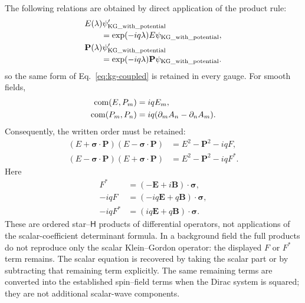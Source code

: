 \documentclass[10pt,letterpaper]{article}
\let\STAamsmathtext\text
\newcommand{\eqtext}[1]{\STAamsmathtext{\normalfont\rmfamily #1}}
\newcommand{\eqfunc}[1]{\operatorname{#1}}
\renewcommand{\text}[1]{\STAamsmathtext{\normalfont\rmfamily #1}}
\newcommand{\pv}[1]{#1}
\newcommand{\vct}[1]{\mathbf{#1}}
\newcommand{\sigv}{\vct{\pv{\bm{\sigma}}}}
\newcommand{\Hop}{\mathsf H}
\newcommand{\conj}[1]{#1^{*}}
\newcommand{\com}[2]{\eqfunc{com}\!\left(#1,#2\right)}
\begin{document}
The following relations are obtained by direct application of the product
rule:
\begin{equation}
\begin{aligned}
&E(\lambda)\psi_{\eqtext{KG\_with\_potential}}'\\[-0.2em]
&\qquad
=\exp(-iq\lambda)E\psi_{\eqtext{KG\_with\_potential}},\\
&\vct{P}(\lambda)\psi_{\eqtext{KG\_with\_potential}}'\\[-0.2em]
&\qquad
=\exp(-iq\lambda)\vct{P}\psi_{\eqtext{KG\_with\_potential}}.
\end{aligned}
\label{eq:kg-gauge}
\end{equation}
so the same form of Eq.\ \eqref{eq:kg-coupled} is retained in every gauge.
For smooth fields,
\begin{align}
\com{E}{P_m}&=iqE_m,\notag\\
\com{P_m}{P_n}&=iq(\partial_mA_n-\partial_nA_m).
\label{eq:commutators}
\end{align}
Consequently, the written order must be retained:
\begin{align}
(E+\sigv\cdot\vct{P})(E-\sigv\cdot\vct{P})
 &=E^2-\vct{P}^2-iq\pv{F},
\label{eq:EP-factorization}\\
(E-\sigv\cdot\vct{P})(E+\sigv\cdot\vct{P})
 &=E^2-\vct{P}^2-iq\conj{\pv{F}}.
\label{eq:EP-factorization-conjugate}
\end{align}
Here
\[
\begin{aligned}
\conj{\pv{F}}&=(-\vct{E}+i\vct{B})\cdot\sigv,\\
-iq\pv{F}&=(-iq\vct{E}+q\vct{B})\cdot\sigv,\\
-iq\conj{\pv{F}}&=(iq\vct{E}+q\vct{B})\cdot\sigv.
\end{aligned}
\]
These are ordered star--\(\Hop\) products of differential operators, not
applications of the scalar-coefficient determinant formula. In a background
field the full products do not reproduce only the scalar Klein--Gordon
operator: the displayed \(\pv{F}\) or \(\conj{\pv{F}}\) term remains. The
scalar equation is recovered by taking the scalar part or by subtracting that
remaining term explicitly. The same remaining terms are converted into the
established spin--field terms when the Dirac system is squared; they are not
additional scalar-wave components.
\end{document}
